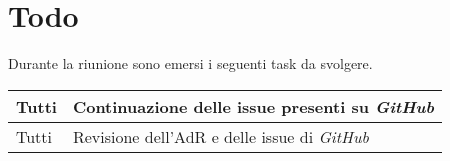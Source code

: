 \section{Todo}
Durante la riunione sono emersi i seguenti task da svolgere.

\begin{center}
  \begin{tabular}{|p{5cm}|p{7cm}|}
    \hline
    Tutti & Continuazione delle issue presenti su \textit{GitHub} \\ \hline
    Tutti & Revisione dell'AdR e delle issue di \textit{GitHub} \\ \hline
  \end{tabular}
\end{center}

